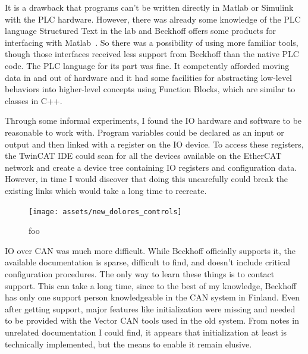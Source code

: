 \documentclass[english,12pt,a4paper,pdftex,eng,utf8]{aaltothesis}
\begin{document}
It is a drawback that programs can't be written directly in Matlab or Simulink with the PLC hardware.  However, there was already some knowledge of the PLC language Structured Text in the lab and Beckhoff offers some products for interfacing with Matlab~\cite{BeckhoffMatlabInterface}.  So there was a possibility of using more familiar tools, though those interfaces received less support from Beckhoff than the native PLC code.  The PLC language for its part was fine.  It competently afforded moving data in and out of hardware and it had some facilities for abstracting low-level behaviors into higher-level concepts using Function Blocks, which are similar to classes in C++.

Through some informal experiments, I found the IO hardware and software to be reasonable to work with.  Program variables could be declared as an input or output and then linked with a register on the IO device.  To access these registers, the TwinCAT IDE could scan for all the devices available on the EtherCAT network and create a device tree containing IO registers and configuration data.  However, in time I would discover that doing this uncarefully could break the existing links which would take a long time to recreate.

\begin{figure}[h]
	\centering
	\texttt{[image: assets/new\_dolores\_controls]}
	\caption{foo}\label{fig:dolores_new_system}
\end{figure}

IO over CAN was much more difficult.  While Beckhoff officially supports it, the available documentation is sparse, difficult to find, and doesn't include critical configuration procedures.  The only way to learn these things is to contact support.  This can take a long time, since to the best of my knowledge, Beckhoff has only one support person knowledgeable in the CAN system in Finland.  Even after getting support, major features like initialization were missing and needed to be provided with the Vector CAN tools used in the old system.  From notes in unrelated documentation I could find, it appears that initialization at least is technically implemented, but the means to enable it remain elusive.
\end{document}

